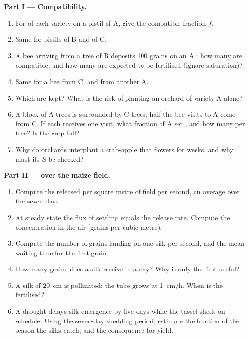 \begin{problem}
\medskip
\noindent\textbf{Part I --- Compatibility.}
\begin{enumerate}
  \item For  of each variety on a pistil of A, give the
        compatible fraction $f$.
  \item Same for pistils of B and of C.
  \item A bee arriving from a tree of B deposits 100 grains on an A
        : how many are compatible, and how many  are
        expected to be fertilised (ignore saturation)?
  \item Same for a bee from C, and from another A.
  \item Which  are kept? What is the risk of planting an
        orchard of variety A alone?
  \item A block of A trees is surrounded by C trees; half the bee
        visits to A come from C. If each  receives one visit,
        what fraction of A  set , and how many 
        per tree? Is the crop full?
  \item Why do orchards interplant a crab-apple that flowers for
        weeks, and why must its $S$  be checked?
\end{enumerate}

\medskip
\noindent\textbf{Part II ---  over the maize field.}
\begin{enumerate}[resume]
  \item Compute the  released per square metre of field per
        second, on average over the seven days.
  \item At steady state the flux of settling  equals the
        release rate. Compute the  concentration in the air
        (grains per cubic metre).
  \item Compute the number of grains landing on one silk per second,
        and the mean waiting time for the first grain.
  \item How many grains does a silk receive in a day? Why is only the
        first useful?
  \item A silk of \qty{20}{cm} is pollinated; the tube grows at
        \qty{1}{cm/h}. When is the  fertilised?
  \item A drought delays silk emergence by five days while the
        tassel sheds on schedule. Using the seven-day shedding
        period, estimate the fraction of the  season the silks
        catch, and the consequence for yield.
\end{enumerate}


\end{problem}
